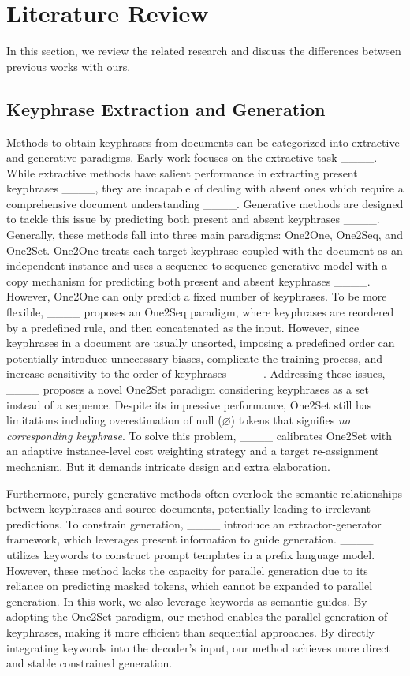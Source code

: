 \section{Literature Review}
\label{s:review}
In this section, we review the related research and discuss the differences between previous works with ours.
\subsection{Keyphrase Extraction and Generation} 
Methods to obtain keyphrases from documents  can be categorized into extractive and generative paradigms.
Early work focuses on the extractive task ____. While extractive methods have salient performance in extracting present keyphrases ____, they are incapable of dealing with absent ones which require a comprehensive document understanding ____. Generative methods are designed to tackle this issue by predicting both present and absent keyphrases ____. Generally, these methods fall into three main paradigms: One2One, One2Seq, and One2Set. 
One2One treats each target keyphrase coupled with the document as an independent instance and uses a sequence-to-sequence generative model with a copy mechanism for predicting both present and absent keyphrases ____. However, One2One can only predict a fixed number of keyphrases. To be more flexible, ____ proposes an One2Seq paradigm, where keyphrases are reordered by a predefined rule, and then concatenated as the input. However, since keyphrases in a document are usually unsorted, imposing a predefined order can potentially introduce unnecessary biases, complicate the training process, and increase sensitivity to the order of keyphrases ____. Addressing these issues, ____ proposes a novel One2Set paradigm considering keyphrases as a set instead of a sequence. 
Despite its impressive performance, One2Set still has limitations including overestimation of null ($\varnothing$) tokens that signifies \textit{no corresponding keyphrase}. To solve this problem, ____ calibrates One2Set with an adaptive instance-level cost weighting strategy and a target re-assignment mechanism. But it demands intricate design and extra elaboration. 

Furthermore, purely generative methods often overlook the semantic relationships between keyphrases and source documents, potentially leading to irrelevant predictions. To constrain generation, ____ introduce an extractor-generator framework, which leverages present information to guide generation. ____ utilizes keywords to construct prompt templates in a prefix language model. However, these method lacks the capacity for parallel generation due to its reliance on predicting masked tokens, which cannot be expanded to parallel generation. In this work, we also leverage keywords as semantic guides. By adopting the One2Set paradigm, our method enables the parallel generation of keyphrases, making it more efficient than sequential approaches. By directly integrating keywords into the decoder's input, our method achieves more direct and stable constrained generation.

